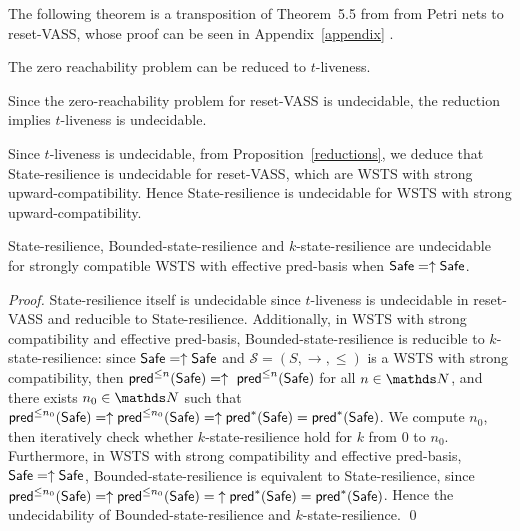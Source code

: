 The following theorem is a transposition of Theorem~5.5 from \cite{peterson1981petri} from Petri nets to reset-VASS, whose proof can be seen in Appendix~\ref{appendix}%
.
\begin{proposition}\label{liveness reset}
The  zero reachability problem can be reduced to {\sc $t$-liveness}.
\end{proposition}



Since the zero-reachability problem for reset-VASS is undecidable, the reduction implies 
%
%
{\sc %
$t$-liveness} is undecidable.

Since {\sc $t$-liveness} is undecidable, from Proposition~\ref{reductions},  we deduce that {\sc State-resilience} is undecidable  for reset-VASS, which are WSTS with strong upward-compatibility. Hence {\sc State-resilience} is undecidable  for WSTS with strong upward-compatibility. %


\begin{theorem}\label{srp up down}
{\sc State-resilience},
{\sc Bounded-state-resilience} and
{\sc $k$-state-resilience}
are undecidable for strongly compatible WSTS with effective pred-basis
when
$\textsf{Safe}=\uparrow \textsf{Safe}$.
\end{theorem}


\begin{proof}
{\sc State-resilience} itself is undecidable %
since 
{\sc $t$-liveness} is undecidable in reset-VASS
and reducible to {\sc State-resilience}.
Additionally, in WSTS with strong compatibility and effective pred-basis, {\sc Bounded-state-resilience} is
reducible to {\sc $k$-state-resilience}:
since $\textsf{Safe}=\uparrow \textsf{Safe}$ and
$\mathscr{S}=(S,\rightarrow,\leq)$ is a WSTS with strong %
compatibility, then $\textsf{pred}^{\leq n}(\textsf{Safe})= \uparrow~\textsf{pred}^{\leq n}(\textsf{Safe})$ for all $n \in \N$,
and there exists $n_0 \in \N$ such that 
$\textsf{pred}^{\leq n_0}(\textsf{Safe}) = \uparrow \textsf{pred}^{\leq n_0}(\textsf{Safe}) = \uparrow \textsf{pred}^*(\textsf{Safe}) = \textsf{pred}^*(\textsf{Safe})$.
We compute 
$n_0$, then iteratively check whether $k$-state-resilience 
hold for $k$ from $0$ to $n_0$.  
Furthermore, in WSTS with strong compatibility and effective pred-basis,  $\textsf{Safe}=\uparrow \textsf{Safe}$, {\sc Bounded-state-resilience} is equivalent to {\sc State-resilience},
since 
$\textsf{pred}^{\leq n_0}(\textsf{Safe}) = \uparrow \textsf{pred}^{\leq n_0}(\textsf{Safe}) = {\uparrow \textsf{pred}^*(\textsf{Safe})} = \textsf{pred}^*(\textsf{Safe})$.
Hence the undecidability of {\sc Bounded-state-resilience}
and 
 {\sc $k$-state-resilience}. \qed
\end{proof}






